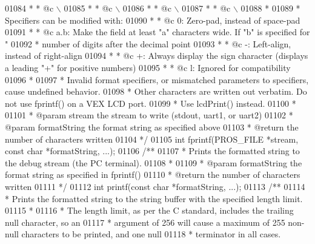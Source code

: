 \begin{DoxyCode}
{{{{01084 \textcolor{comment}{ * * @c \(\backslash\)%
01085 \textcolor{comment}{ * * @c \(\backslash\)%
01086 \textcolor{comment}{ * * @c \(\backslash\)%
01087 \textcolor{comment}{ * * @c \(\backslash\)%
01088 \textcolor{comment}{ *}
01089 \textcolor{comment}{ * Specifiers can be modified with:}
01090 \textcolor{comment}{ * * @c 0: Zero-pad, instead of space-pad}
01091 \textcolor{comment}{ * * @c a.b: Make the field at least "a" characters wide. If "b" is specified for "%
01092 \textcolor{comment}{ *           number of digits after the decimal point}
01093 \textcolor{comment}{ * * @c -: Left-align, instead of right-align}
01094 \textcolor{comment}{ * * @c +: Always display the sign character (displays a leading "+" for positive numbers)}
01095 \textcolor{comment}{ * * @c l: Ignored for compatibility}
01096 \textcolor{comment}{ *}
01097 \textcolor{comment}{ * Invalid format specifiers, or mismatched parameters to specifiers, cause undefined behavior.}
01098 \textcolor{comment}{ * Other characters are written out verbatim. Do not use fprintf() on a VEX LCD port.}
01099 \textcolor{comment}{ * Use lcdPrint() instead.}
01100 \textcolor{comment}{ *}
01101 \textcolor{comment}{ * @param stream the stream to write (stdout, uart1, or uart2)}
01102 \textcolor{comment}{ * @param formatString the format string as specified above}
01103 \textcolor{comment}{ * @return the number of characters written}
01104 \textcolor{comment}{ */}
01105 \textcolor{keywordtype}{int} fprintf(PROS_FILE *stream, \textcolor{keyword}{const} \textcolor{keywordtype}{char} *formatString, ...);
01106 \textcolor{comment}{/**}
01107 \textcolor{comment}{ * Prints the formatted string to the debug stream (the PC terminal).}
01108 \textcolor{comment}{ *}
01109 \textcolor{comment}{ * @param formatString the format string as specified in fprintf()}
01110 \textcolor{comment}{ * @return the number of characters written}
01111 \textcolor{comment}{ */}
01112 \textcolor{keywordtype}{int} printf(\textcolor{keyword}{const} \textcolor{keywordtype}{char} *formatString, ...);
01113 \textcolor{comment}{/**}
01114 \textcolor{comment}{ * Prints the formatted string to the string buffer with the specified length limit.}
01115 \textcolor{comment}{ *}
01116 \textcolor{comment}{ * The length limit, as per the C standard, includes the trailing null character, so an}
01117 \textcolor{comment}{ * argument of 256 will cause a maximum of 255 non-null characters to be printed, and one null}
01118 \textcolor{comment}{ * terminator in all cases.}
}}}}}}}}}
\end{DoxyCode}
